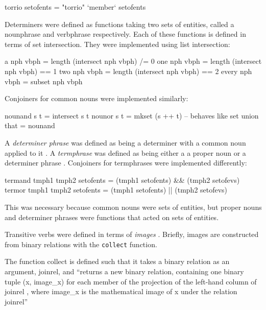 \documentclass[../main.tex]{subfiles}
\begin{document}
\begin{code}
	torrio setofents  = "torrio" `member` setofents
\end{code}

Determiners were defined as functions taking two sets of entities, called
a nounphrase and verbphrase respectively.  Each of these functions
is defined in terms of set intersection.  They were implemented using
list intersection:

\begin{code}
  a     nph vbph     = length (intersect nph vbph) /= 0
  one   nph vbph     = length (intersect nph vbph)  == 1
  two   nph vbph     = length (intersect nph vbph)  == 2
  every nph vbph     = subset  nph vbph
\end{code}

Conjoiners for common nouns were implemented similarly:

\begin{code}
  nounand s t  = intersect s t
  nounor  s t  = mkset (s ++ t) -- behaves like set union
  that         = nounand
\end{code}


A {\em determiner phrase} was defined as being a determiner with a common noun applied to it \cite{frost2014denotational}.
A {\em termphrase} was defined as being either a a proper noun or a determiner phrase \cite{frost2014denotational}.
Conjoiners for termphrases were implemented differently:

\begin{code}
  termand tmph1 tmph2 setofents =  (tmph1 setofents) && (tmph2 setofevs)
  termor  tmph1 tmph2 setofents =  (tmph1 setofents) || (tmph2 setofevs)
\end{code}

This was necessary because common nouns were sets of entities, but
proper nouns and determiner phrases were functions that acted on sets
of entities.

Transitive verbs were defined in terms of {\em images} \cite{frost2014denotational}.  Briefly, images
are constructed from binary relations with the \texttt{collect} function.

\begin{definition}
The function collect is defined such that it takes a binary relation as an
argument, joinrel, and ``returns a new binary relation, containing one binary tuple
(x, image\_x) for each member of the projection of the left-hand column of joinrel
, where image\_x is the mathematical image of x under the relation joinrel'' \cite{frost2014denotational}
\end{definition}
\end{document}
